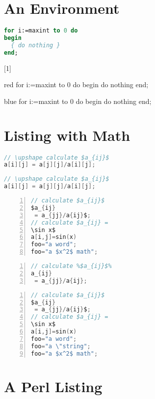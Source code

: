 \documentclass{article}
\begin{document}
\section{An Environment}
\begin{lstlisting}[language=Pascal]
for i:=maxint to 0 do
begin
  { do nothing }
end;
\end{lstlisting}

[1]{}{}
\begin{colored}{red}
for i:=maxint to 0 do
begin
  { do nothing }
end;
\end{colored}

\begin{colored}{blue}
for i:=maxint to 0 do
begin
  { do nothing }
end;
\end{colored}

\section{Listing with Math}
\begin{lstlisting}[language=c,texcl,commentstyle=\color{green}]
// \upshape calculate $a_{ij}$
a[i][j] = a[j][j]/a[i][j];
\end{lstlisting}

\begin{lstlisting}[texcl,language=c]
// \upshape calculate $a_{ij}$
a[i][j] = a[j][j]/a[i][j];
\end{lstlisting}

\begin{lstlisting}[language=c,mathescape,numbers=left,commentstyle=\color{green}]
// calculate $a_{ij}$
$a_{ij}
 = a_{jj}/a{ij}$;
// calculate $a_{ij} = 
\sin x$
a[i,j]=sin(x)
foo="a word";
foo="a $x^2$ math";
\end{lstlisting}

\begin{lstlisting}[language=c,escapechar=\%,escapebegin=\textless,escapeend=\textgreater,numbers=left]
// calculate %$a_{ij}$%
a_{ij}
 = a_{jj}/a{ij};
\end{lstlisting}

\begin{lstlisting}[language=c,numbers=left,stringstyle=\ttfamily]
// calculate $a_{ij}$
$a_{ij}
 = a_{jj}/a{ij}$;
// calculate $a_{ij} = 
\sin x$
a[i,j]=sin(x)
foo="a word";
foo="a \"string";
foo="a $x^2$ math";
\end{lstlisting}

\section{A Perl Listing}

\end{document}
